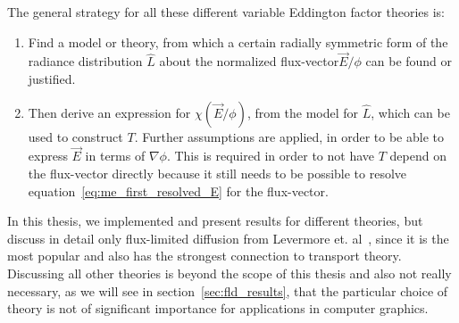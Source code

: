 The general strategy for all these different variable Eddington factor theories is:
\begin{enumerate}
\item Find a model or theory, from which a certain radially symmetric form of the radiance distribution $\hat{L}$ about the normalized flux-vector$\vec{E}/\phi$ can be found or justified.
\item Then derive an expression for $\chi(\vec{E}/\phi)$, from the model for $\hat{L}$, which can be used to construct $T$. Further assumptions are applied, in order to be able to express $\vec{E}$ in terms of $\nabla\phi$. This is required in order to not have $T$ depend on the flux-vector directly because it still needs to be possible to resolve equation~\ref{eq:me_first_resolved_E} for the flux-vector.
\end{enumerate}

In this thesis, we implemented and present results for different theories, but discuss in detail only flux-limited diffusion from Levermore et. al~\cite{Levermore81}, since it is the most popular and also has the strongest connection to transport theory. Discussing all other theories is beyond the scope of this thesis and also not really necessary, as we will see in section~\ref{sec:fld_results}, that the particular choice of theory is not of significant importance for applications in computer graphics.